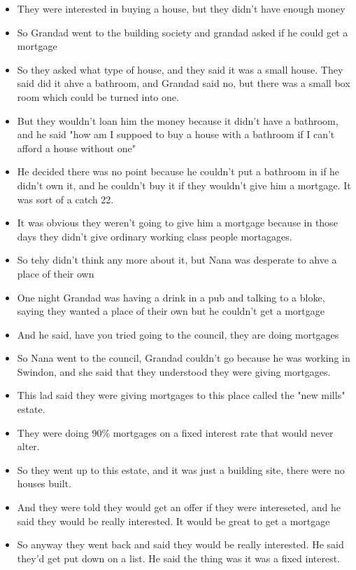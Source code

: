 \documentclass[10pt,twocolumn,letterpaper]{article}
\begin{document}
\begin{itemize}
    \item They were interested in buying a house, but they didn't have enough money
    \item So Grandad went to the building society and grandad asked if he could get a mortgage
    \item So they asked what type of house, and they said it was a small house. They said did it ahve a bathroom, and Grandad said no, but there was a small box room which could be turned into one.
    \item But they wouldn't loan him the money because it didn't have a bathroom, and he said "how am I suppoed to buy a house with a bathroom if I can't afford a house without one"
    \item He decided there was no point because he couldn't put a bathroom in if he didn't own it, and he couldn't buy it if they wouldn't give him a mortgage. It was sort of a catch 22.
    \item It was obvious they weren't going to give him a mortgage because in those days they didn't give ordinary working class people mortagages.
    \item So tehy didn't think any more about it, but Nana was desperate to ahve a place of their own
    \item One night Grandad was having a drink in a pub and talking to a bloke, saying they wanted a place of their own but he couldn't get a mortgage
    \item And he said, have you tried going to the council, they are doing mortgages
    \item So Nana went to the council, Grandad couldn't go because he was working in Swindon, and she said that they understood they were giving mortgages.
    \item This lad said they were giving mortgages to this place called the "new mills" estate.
    \item They were doing 90\% mortgages on a fixed interest rate that would never alter.
    \item So they went up to this estate, and it was just a building site, there were no houses built.
    \item And they were told they would get an offer if they were intereseted, and he said they would be really interested. It would be great to get a mortgage
    \item So anyway they went back and said they would be really interested. He said they'd get put down on a list. He said the thing was it was a fixed interest.

\end{itemize}
\end{document}
